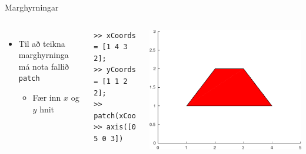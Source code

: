 \documentclass[handout]{beamer}
\begin{document}
\begin{frame}[fragile]{Marghyrningar}
\begin{columns}
\begin{itemize}
 \item Til að teikna marghyrninga má nota fallið \texttt{patch}
 \begin{itemize}
  \item Fær inn $x$ og $y$ hnit
 \end{itemize}
\end{itemize}
\begin{verbatim}
>> xCoords = [1 4 3 2];
>> yCoords = [1 1 2 2];
>> patch(xCoords,yCoords,'r')
>> axis([0 5 0 3])
\end{verbatim}
\includegraphics[width=\textwidth]{../Pics/patch-example}
\end{columns}
\end{frame}
\end{document}
